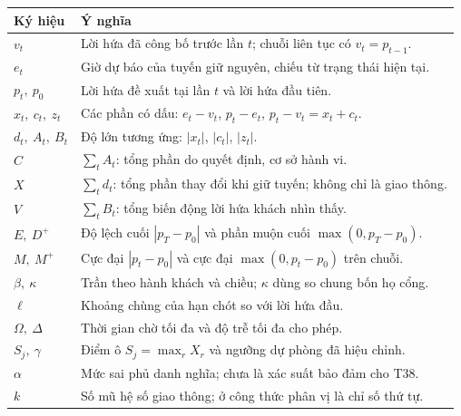 \begin{longtable}{@{}p{2.4cm}p{12.4cm}@{}}
\toprule
\textbf{Ký hiệu} & \textbf{Ý nghĩa}\\
\midrule
\endhead
$v_t$ & Lời hứa đã công bố trước lần $t$; chuỗi liên tục có $v_t=p_{t-1}$.\\
$e_t$ & Giờ dự báo của tuyến giữ nguyên, chiếu từ trạng thái hiện tại.\\
$p_t,\ p_0$ & Lời hứa đề xuất tại lần $t$ và lời hứa đầu tiên.\\
$x_t,\ c_t,\ z_t$ & Các phần có dấu: $e_t-v_t$, $p_t-e_t$, $p_t-v_t=x_t+c_t$.\\
$d_t,\ A_t,\ B_t$ & Độ lớn tương ứng: $|x_t|$, $|c_t|$, $|z_t|$.\\
$C$ & $\sum_t A_t$: tổng phần do quyết định, cơ sở hành vi.\\
$X$ & $\sum_t d_t$: tổng phần thay đổi khi giữ tuyến; không chỉ là giao thông.\\
$V$ & $\sum_t B_t$: tổng biến động lời hứa khách nhìn thấy.\\
$E,\ D^{+}$ & Độ lệch cuối $|p_T-p_0|$ và phần muộn cuối $\max(0,p_T-p_0)$.\\
$M,\ M^{+}$ & Cực đại $|p_t-p_0|$ và cực đại $\max(0,p_t-p_0)$ trên chuỗi.\\
$\beta,\ \kappa$ & Trần theo hành khách và chiều; $\kappa$ dùng so chung bốn họ cổng.\\
$\ell$ & Khoảng chùng của hạn chót so với lời hứa đầu.\\
$\Omega,\ \Delta$ & Thời gian chờ tối đa và độ trễ tối đa cho phép.\\
$S_j,\ \gamma$ & Điểm ô $S_j=\max_r X_r$ và ngưỡng dự phòng đã hiệu chỉnh.\\
$\alpha$ & Mức sai phủ danh nghĩa; chưa là xác suất bảo đảm cho T38.\\
$k$ & Số mũ hệ số giao thông; ở công thức phân vị là chỉ số thứ tự.\\
\bottomrule
\end{longtable}

\clearpage

